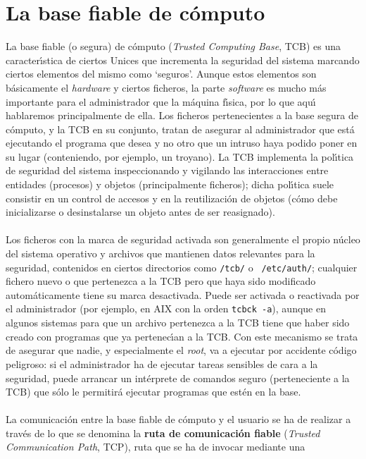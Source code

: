\section{La base fiable de c\'omputo}
La base fiable (o segura) de c\'omputo ({\it Trusted Computing Base}, TCB) es
una caracter\'{\i}stica de ciertos Unices que incrementa la seguridad del 
sistema marcando ciertos elementos del mismo como `seguros'. Aunque estos 
elementos son b\'asicamente el {\it hardware} y ciertos ficheros, la parte {\it 
software} es mucho m\'as importante para el administrador que la m\'aquina 
f\'{\i}sica, por lo que aqu\'{\i} hablaremos principalmente de ella.
Los ficheros pertenecientes a la base segura de c\'omputo, y la TCB en su 
conjunto, tratan de asegurar al 
administrador que est\'a ejecutando el programa que desea y no otro que un 
intruso haya podido poner en su lugar (conteniendo, por ejemplo, un troyano).
La TCB implementa la pol\'{\i}tica de seguridad del sistema inspeccionando y
vigilando las interacciones entre entidades (procesos) y objetos (principalmente
ficheros); dicha pol\'{\i}tica suele consistir en un control de accesos y en la 
reutilizaci\'on de objetos (c\'omo debe inicializarse o desinstalarse un objeto 
antes de ser reasignado).\\
\\Los ficheros con la marca de seguridad activada son generalmente el propio 
n\'ucleo del sistema operativo y archivos que mantienen datos relevantes para 
la seguridad, contenidos en ciertos directorios como {\tt /tcb/} o {\tt 
/etc/auth/}; cualquier fichero nuevo o que pertenezca a la TCB pero que haya 
sido modificado autom\'aticamente tiene su marca desactivada. Puede ser 
activada o reactivada por el administrador (por ejemplo, en AIX con la orden 
{\tt tcbck -a}), aunque en algunos sistemas para que 
un archivo pertenezca a la TCB tiene que haber sido creado con programas que ya 
pertenec\'{\i}an a la TCB. Con este mecanismo se trata de asegurar que nadie,
y especialmente el {\it root}, va a ejecutar por accidente c\'odigo peligroso:
si el administrador ha de ejecutar tareas sensibles de cara a la seguridad, 
puede arrancar un int\'erprete de comandos seguro (perteneciente a la TCB) que
s\'olo le permitir\'a ejecutar programas que est\'en en la base.\\
\\La comunicaci\'on entre la base fiable de c\'omputo y el usuario se ha de
realizar a trav\'es de lo que se denomina la {\bf ruta de comunicaci\'on fiable}
({\it Trusted Communication Path}, TCP), ruta que se ha de invocar mediante una
